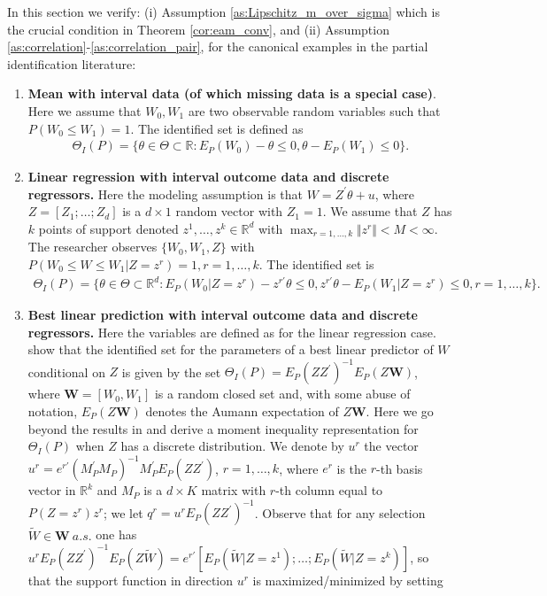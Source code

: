\documentclass[letterpaper,11pt]{article}
\theoremstyle{myplain}
\theoremstyle{mydefinition}
\theoremstyle{myremark}
\renewcommand{\cite}{\citet}
\newcommand{\R}{\mathbb{R}}
\numberwithin{equation}{section}
\numberwithin{figure}{section}
\begin{document}
\begin{appendices}
In this section we verify: (i) Assumption \ref{as:Lipschitz_m_over_sigma} which is the crucial condition in Theorem \ref{cor:eam_conv}, and (ii) Assumption \ref{as:correlation}-\ref{as:correlation_pair}, for the canonical examples in the partial identification literature:
\begin{enumerate}
\item \textbf{Mean with interval data (of which missing data is a special case)}. Here we assume that $W_0,W_1$ are two observable random variables such that $P(W_0\le W_1)=1$. The identified set is defined as
\begin{align}
\Theta_I(P)=\{\theta \in \Theta \subset \R: E_P(W_0)-\theta \le 0, \theta -E_P(W_1)\le 0\}.\label{eq:Theta_I:mean}
\end{align}
\item \textbf{Linear regression with interval outcome data and discrete regressors.} Here the modeling assumption is that $W=Z^\prime \theta +u$, where $Z=[Z_1;\dots;Z_d]$ is a $d\times 1$ random vector with $Z_1=1$. We assume that $Z$ has $k$ points of support denoted $z^1,\dots,z^k \in \R^d$ with $\max_{r=1,\dots,k}\Vert z^r \Vert<M<\infty$. The researcher observes $\{W_0,W_1,Z\}$ with $P(W_0\le W \le W_1|Z=z^r)=1,r=1,\dots,k$.
The identified set is
\begin{align}
\Theta_I(P)=\{\theta \in \Theta \subset \R^d: E_P(W_0|Z=z^r)-z^{r\prime} \theta \le 0, z^{r\prime} \theta-E_P(W_1|Z=z^r) \le 0, r=1,\dots,k\}.\label{eq:Theta_I:OLS}
\end{align}
\item \textbf{Best linear prediction with interval outcome data and discrete regressors.} Here the variables are defined as for the linear regression case.
\cite{ber:mol08} show that the identified set for the parameters of a best linear predictor of $W$ conditional on $Z$ is given by the set $\Theta_I(P)=E_P(ZZ^\prime)^{-1}E_P(Z\mathbf{W})$, where $\mathbf{W}=[W_0,W_1]$ is a random closed set and, with some abuse of notation, $E_P(Z\mathbf{W})$ denotes the Aumann expectation of $Z\mathbf{W}$. \newline
Here we go beyond the results in \cite{ber:mol08} and derive a moment inequality representation for $\Theta_I(P)$ when $Z$ has a discrete distribution. We denote by $u^r$ the vector $u^r=e^{r\prime}(M_{P}^\prime M_{P})^{-1}M_{P}^\prime E_P(ZZ^\prime)$, $r=1,\dots,k$, where $e^r$ is the $r$-th basis vector in $\R^k$ and $M_{P}$ is a $d\times K$ matrix with $r$-th column equal to $P(Z=z^r)z^r$; we let $q^r=u^r E_P(ZZ^\prime)^{-1}$. Observe that for any selection $\tilde{W}\in \mathbf{W}~a.s.$ one has $u^rE_P(ZZ^\prime)^{-1}E_P(Z\tilde{W})=e^{r\prime}[E_P(\tilde{W}|Z=z^1);\dots;E_P(\tilde{W}|Z=z^k)]$, so that the support function in direction $u^r$ is maximized/minimized by setting

\end{enumerate}
\end{appendices}
\end{document}
